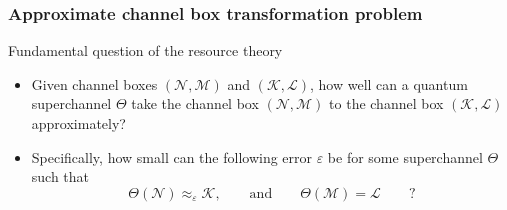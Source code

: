 \documentclass[usenames,dvipsnames,handout]{beamer}
\begin{document}
\begin{frame}
\frametitle{Approximate channel box transformation problem}

\begin{block}{Fundamental question of the resource theory}

\begin{itemize}

\pause
\item Given channel boxes $(\mathcal{N}, \mathcal{M})$ and  $(\mathcal{K}, \mathcal{L})$, how well can a quantum superchannel $\Theta$ take the channel box
$(\mathcal{N}, \mathcal{M})$ to the channel box $(\mathcal{K},  \mathcal{L})$ approximately?

\pause
\vspace{.1in}
\item Specifically, how small can the following error $\varepsilon$ be for some superchannel $\Theta$ such that 
$$
\Theta(\mathcal{N}) \approx_{\varepsilon} \mathcal{K}, \qquad \text{and} \qquad \Theta(\mathcal{M}) = \mathcal{L}   \qquad ?
$$




\end{itemize}

\end{block}

\end{frame}
\end{document}
